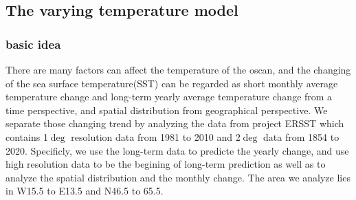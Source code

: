 \documentclass{mcmthesis}
\begin{document}
 \subsection{The varying temperature model}
 \cite{long2014fast}
  \subsubsection{basic idea}
    There are many factors can affect the temperature of the oscan, and the changing of the sea surface temperature(SST) can be 
    regarded as short monthly average temperature change and long-term yearly average temperature change from a time perspective, and spatial distribution from geographical perspective. We separate those changing trend by analyzing the data from project ERSST which contains 1$\deg$ resolution data from 1981 to 2010 and 2$\deg$ data from 1854 to 2020. Specificly, we use the long-term data to predicte the yearly change, and use high resolution data to be the begining of long-term prediction as well as to analyze the spatial distribution and the monthly change. The area we analyze lies in W15.5 to E13.5 and N46.5 to 65.5.
    

    \begin{figure}[htbp]
      \centering
      
      \centering
      \caption{}
    \end{figure}
\end{document}
